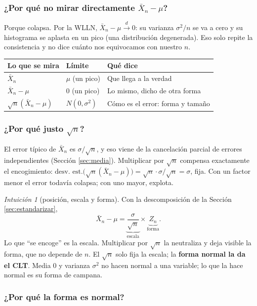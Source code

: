 \documentclass[11pt,a4paper]{article}
\theoremstyle{plain}
\theoremstyle{definition}
\theoremstyle{remark}
\newtheorem*{intuicion}{Intuición}
\newcommand{\cd}{\xrightarrow{\;d\;}}
\begin{document}
\subsubsection*{¿Por qué no mirar directamente $\bar X_n-\mu$?}

Porque colapsa. Por la WLLN, $\bar X_n-\mu\cd0$: su varianza $\sigma^2/n$ se va a cero y su
histograma se aplasta en un pico (una distribución degenerada). Eso solo repite la
consistencia y no dice cuánto nos equivocamos con nuestro $n$.

\begin{center}
\begin{tabular}{@{}lll@{}}
\toprule
Lo que se mira & Límite & Qué dice \\
\midrule
$\bar X_n$ & $\mu$ (un pico) & Que llega a la verdad \\
$\bar X_n-\mu$ & $0$ (un pico) & Lo mismo, dicho de otra forma \\
$\sqrt n(\bar X_n-\mu)$ & $N(0,\sigma^2)$ & Cómo es el error: forma y tamaño \\
\bottomrule
\end{tabular}
\end{center}

\subsubsection*{¿Por qué justo $\sqrt n$?}

El error típico de $\bar X_n$ es $\sigma/\sqrt n$, y eso viene de la cancelación parcial de
errores independientes (Sección \ref{sec:media}). Multiplicar por $\sqrt n$ compensa
exactamente el encogimiento:
$\text{desv. est.}\big(\sqrt n(\bar X_n-\mu)\big)=\sqrt n\cdot\sigma/\sqrt n=\sigma$, fija.
Con un factor menor el error todavía colapsa; con uno mayor, explota.

\begin{intuicion}[posición, escala y forma]
Con la descomposición de la Sección \ref{sec:estandarizar},
\[
\bar X_n-\mu=\underbrace{\frac{\sigma}{\sqrt n}}_{\text{escala}}\times
\underbrace{Z_n}_{\text{forma}} .
\]
Lo que ``se encoge'' es la escala. Multiplicar por $\sqrt n$ la neutraliza y deja visible la
forma, que no depende de $n$. El $\sqrt n$ solo fija la escala; la \textbf{forma normal la da
el CLT}. Media $0$ y varianza $\sigma^2$ no hacen normal a una variable; lo que la hace normal
es su forma de campana.
\end{intuicion}

\subsubsection*{¿Por qué la forma es normal?}
\end{document}
